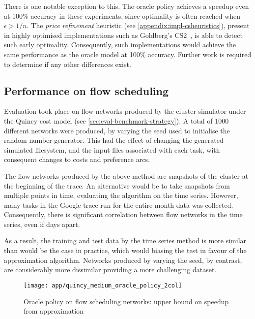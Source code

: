 There is one notable exception to this. The oracle policy achieves a speedup even at 100\% accuracy in these experiments, since optimality is often reached when $\epsilon > 1/n$. The \emph{price refinement} heuristic (see \cref{appendix:impl-csheuristics}), present in highly optimised implementations such as Goldberg's CS2~\cite{CS2:2009}, is able to detect such early optimality. Consequently, such implementations would achieve the same performance as the oracle model at 100\% accuracy. Further work is required to determine if any other differences exist.


\subsection{Performance on flow scheduling}

Evaluation took place on flow networks produced by the cluster simulator under the Quincy cost model (see \cref{sec:eval-benchmark-strategy}). A total of 1000 different networks were produced, by varying the seed used to initialise the random number generator. This had the effect of changing the generated simulated filesystem, and the input files associated with each task, with consequent changes to costs and preference arcs.

The flow networks produced by the above method are snapshots of the cluster at the beginning of the trace. An alternative would be to take snapshots from multiple points in time, evaluating the algorithm on the time series. However, many tasks in the Google trace run for the entire month data was collected. Consequently, there is significant correlation between flow networks in the time series, even if days apart.

As a result, the training and test data by the time series method is more similar than would be the case in practice, which would biasing the test in favour of the approximation algorithm. Networks produced by varying the seed, by contrast, are considerably more dissimilar providing a more challenging dataset.

\begin{figure}
    \centering
    \texttt{[image: app/quincy\_medium\_oracle\_policy\_2col]}
    \caption{Oracle policy on flow scheduling networks: upper bound on speedup from approximation}
    \label{fig:app-quincy-medium-oracle}
\end{figure}

